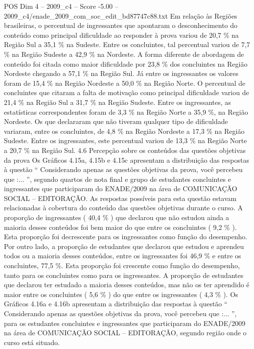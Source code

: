 \begin{textsample}{POS Dim 4 – 2009\_c4 – Score -5.00 – 2009\_c4/enade\_2009\_com\_soc\_edit\_bd87747c88.txt}
Em relação às Regiões brasileiras, o percentual de ingressantes que apontaram o desconhecimento do conteúdo como principal dificuldade ao responder à prova variou de 20,7 \% na Região Sul a 35,1 \% na Sudeste.
Entre os concluintes, tal percentual variou de 7,7 \% na Região Sudeste a 42,9 \% na Nordeste.
A forma diferente de abordagem de conteúdo foi citada como maior dificuldade por 23,8 \% dos concluintes na Região Nordeste chegando a 57,1 \% na Região Sul.
Já entre os ingressantes os valores foram de 15,4 \% na Região Nordeste a 50,0 \% na Região Norte.
O percentual de concluintes que citaram a falta de motivação como principal dificuldade variou de 21,4 \% na Região Sul a 31,7 \% na Região Sudeste.
Entre os ingressantes, as estatísticas correspondentes foram de 3,3 \% na Região Norte a 35,9 \%, na Região Nordeste.
Os que declararam que não tiveram qualquer tipo de dificuldade variaram, entre os concluintes, de 4,8 \% na Região Nordeste a 17,3 \% na Região Sudeste.
Entre os ingressantes, este percentual variou de 13,3 \% na Região Norte a 20,7 \% na Região Sul. 4.6 Percepção sobre os conteúdos das questões objetivas da prova Os Gráficos 4.15a, 4.15b e 4.15c apresentam a distribuição das respostas à questão “ Considerando apenas as questões objetivas da prova, você percebeu que :... ”, segundo quartos de nota final e grupo de estudantes concluintes e ingressantes que participaram do ENADE/2009 na área de COMUNICAÇÃO SOCIAL – EDITORAÇÃO.
As respostas possíveis para esta questão estavam relacionadas à cobertura do conteúdo das questões objetivas durante o curso.
A proporção de ingressantes ( 40,4 \% ) que declarou que não estudou ainda a maioria desses conteúdos foi bem maior do que entre os concluintes ( 9,2 \% ).
Esta proporção foi decrescente para os ingressantes como função do desempenho.
Por outro lado, a proporção de estudantes que declarou que estudou e aprendeu todos ou a maioria desses conteúdos, entre os ingressantes foi 46,9 \% e entre os concluintes, 77,5 \%.
Esta proporção foi crescente como função do desempenho, tanto para os concluintes como para os ingressantes.
A proporção de estudantes que declarou ter estudado a maioria desses conteúdos, mas não os ter aprendido é maior entre os concluintes ( 5,6 \% ) do que entre os ingressantes ( 4,3 \% ).
Os Gráficos 4.16a e 4.16b apresentam a distribuição das respostas à questão “ Considerando apenas as questões objetivas da prova, você percebeu que :... ”, para os estudantes concluintes e ingressantes que participaram do ENADE/2009 na área de COMUNICAÇÃO SOCIAL – EDITORAÇÃO, segundo região onde o curso está situado.

\end{textsample}
